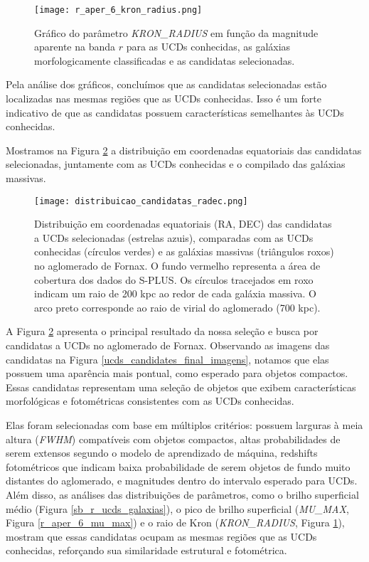 \begin{figure}[!ht]
    \begin{center}
    \texttt{[image: r\_aper\_6\_kron\_radius.png]}
    \caption[]{Gráfico do parâmetro \textit{KRON\_RADIUS} em função da magnitude aparente na banda $r$ para as UCDs conhecidas, as galáxias morfologicamente classificadas e as candidatas selecionadas.}
    \label{r_aper_6_kron_radius}
    \end{center}
\end{figure}

Pela análise dos gráficos, concluímos que as candidatas selecionadas estão localizadas nas mesmas regiões que as UCDs conhecidas. Isso é um forte indicativo de que as candidatas possuem características semelhantes às UCDs conhecidas.

Mostramos na Figura \ref{distribuicao_candidatas_radec} a distribuição em coordenadas equatoriais das candidatas selecionadas, juntamente com as UCDs conhecidas e o compilado das galáxias massivas.

\begin{figure}[!ht]
    \begin{center}
    \texttt{[image: distribuicao\_candidatas\_radec.png]}
    \caption[]{Distribuição em coordenadas equatoriais (RA, DEC) das candidatas a UCDs selecionadas (estrelas azuis), comparadas com as UCDs conhecidas (círculos verdes) e as galáxias massivas (triângulos roxos) no aglomerado de Fornax. O fundo vermelho representa a área de cobertura dos dados do S-PLUS. Os círculos tracejados em roxo indicam um raio de 200 kpc ao redor de cada galáxia massiva. O arco preto corresponde ao raio de virial do aglomerado (700 kpc).}
    \label{distribuicao_candidatas_radec}
    \end{center}
\end{figure}

A Figura \ref{distribuicao_candidatas_radec} apresenta o principal resultado da nossa seleção e busca por candidatas a UCDs no aglomerado de Fornax. Observando as imagens das candidatas na Figura \ref{ucds_candidates_final_imagens}, notamos que elas possuem uma aparência mais pontual, como esperado para objetos compactos. Essas candidatas representam uma seleção de objetos que exibem características morfológicas e fotométricas consistentes com as UCDs conhecidas.

Elas foram selecionadas com base em múltiplos critérios: possuem larguras à meia altura (\textit{FWHM}) compatíveis com objetos compactos, altas probabilidades de serem extensos segundo o modelo de aprendizado de máquina, redshifts fotométricos que indicam baixa probabilidade de serem objetos de fundo muito distantes do aglomerado, e magnitudes dentro do intervalo esperado para UCDs. Além disso, as análises das distribuições de parâmetros, como o brilho superficial médio (Figura \ref{sb_r_ucds_galaxias}), o pico de brilho superficial (\textit{MU\_MAX}, Figura \ref{r_aper_6_mu_max}) e o raio de Kron (\textit{KRON\_RADIUS}, Figura \ref{r_aper_6_kron_radius}), mostram que essas candidatas ocupam as mesmas regiões que as UCDs conhecidas, reforçando sua similaridade estrutural e fotométrica.

